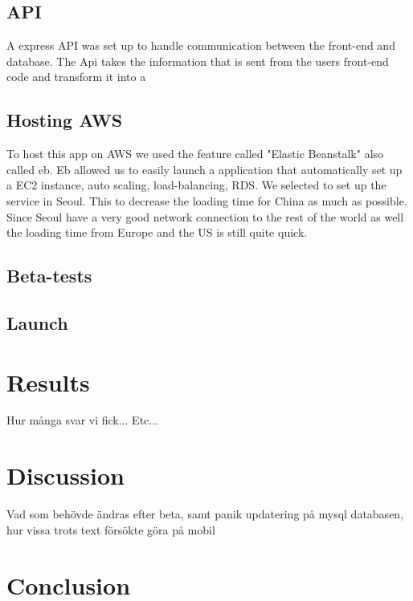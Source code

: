 \subsection{API}
A express API was set up to handle communication between the front-end and database. The Api takes the information that is sent from the users front-end code and transform it into a 

\subsection{Hosting AWS}
To host this app on AWS we used the feature called "Elastic Beanstalk" also called eb. Eb allowed us to easily launch a application that automatically set up a EC2 instance, auto scaling, load-balancing, RDS. We selected to set up the service in Seoul. This to decrease the loading time for China as much as possible. Since Seoul have a very good network connection to the rest of the world as well the loading time from Europe and the US is still quite quick.

\subsection{Beta-tests}

\subsection{Launch}
\section{Results}
Hur många svar vi fick... Etc...


\section{Discussion}
Vad som behövde ändras efter beta, samt panik updatering på mysql databasen, hur vissa trots text försökte göra på mobil

\section{Conclusion}
